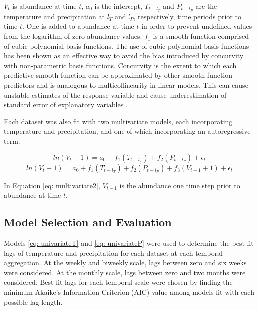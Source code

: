$V_t$ is abundance at time $t$, $a_0$ is the intercept, $T_{t-l_T}$ and $P_{t-l_P}$ are the temperature and precipitation at $l_T$ and $l_P$, respectively, time periods prior to time $t$. One is added to abundance at time $t$ in order to prevent undefined values from the logarithm of zero abundance values. $f_1$ is a smooth function comprised of cubic polynomial basis functions. The use of cubic polynomial basis functions has been shown as an effective way to avoid the bias introduced by concurvity with non-parametric basis functions\citep{Dominici2002, Ramsay2003}. Concurvity is the extent to which each predictive smooth function can be approximated by other smooth function predictors and is analogous to multicollinearity in linear models. This can cause unstable estimates of the response variable and cause underestimation of standard error of explanatory variables \citep{Ramsay2003}. 

Each dataset was also fit with two multivariate models, each incorporating temperature and precipitation, and one of which incorporating an autoregressive term.

\begin{equation}
	ln(V_t + 1) = a_0 + f_1(T_{t-l_T}) + f_2(P_{t-l_P}) + \epsilon_t
	\label{eq: multivariate1}
\end{equation}
\begin{equation}
	ln(V_t + 1) = a_0 + f_1(T_{t-l_T}) + f_2(P_{t-l_P}) + f_3(V_{t-1} + 1) + \epsilon_t
	\label{eq: multivariate2}
\end{equation}

In Equation \ref{eq: multivariate2}, $V_{t-1}$ is the abundance one time step prior to abundance at time $t$. 


\subsection{Model Selection and Evaluation}

Models \ref{eq: univariateT} and \ref{eq: univariateP} were used to determine the best-fit lags of temperature and precipitation for each dataset at each temporal aggregation. At the weekly and biweekly scale, lags between zero and six weeks were considered. At the monthly scale, lags between zero and two months were considered. Best-fit lags for each temporal scale were chosen by finding the minimum Akaike's Information Criterion (AIC) value among models fit with each possible lag length. 


